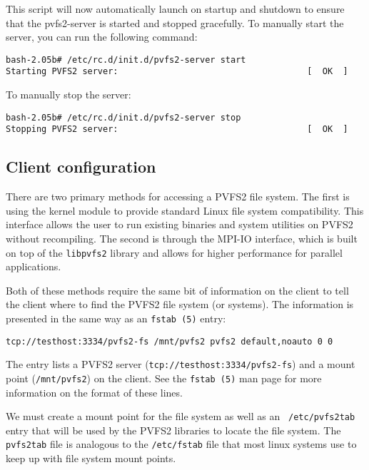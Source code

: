 \documentclass[11pt, letterpaper]{article}
\begin{document}
This script will now automatically launch on startup and shutdown to 
ensure that the pvfs2-server is started and stopped gracefully.
To manually start the server, you can run the following command:

\begin{verbatim}
bash-2.05b# /etc/rc.d/init.d/pvfs2-server start
Starting PVFS2 server:                                     [  OK  ]
\end{verbatim}

To manually stop the server:

\begin{verbatim}
bash-2.05b# /etc/rc.d/init.d/pvfs2-server stop
Stopping PVFS2 server:                                     [  OK  ]
\end{verbatim}

\subsection{Client configuration}
\label{subsec:client}

There are two primary methods for accessing a PVFS2 file system.  The first is
using the kernel module to provide standard Linux file system compatibility.
This interface allows the user to run existing binaries and system utilities
on PVFS2 without recompiling.  The second is through the MPI-IO interface,
which is built on top of the \texttt{libpvfs2} library and allows for higher
performance for parallel applications.

Both of these methods require the same bit of information on the client to
tell the client where to find the PVFS2 file system (or systems).  The
information is presented in the same way as an \texttt{fstab (5)} entry:

\begin{verbatim}
tcp://testhost:3334/pvfs2-fs /mnt/pvfs2 pvfs2 default,noauto 0 0 
\end{verbatim}

The entry lists a PVFS2 server (\texttt{tcp://testhost:3334/pvfs2-fs}) and a
mount point (\texttt{/mnt/pvfs2}) on the client.  See the \texttt{fstab (5)}
man page for more information on the format of these lines.

We must create a mount point for the file system as well as an {\tt
/etc/pvfs2tab} entry that will be used by the PVFS2 libraries to
locate the file system.  The {\tt pvfs2tab} file is analogous to the
{\tt /etc/fstab} file that most linux systems use to keep up with file
system mount points.
\end{document}
